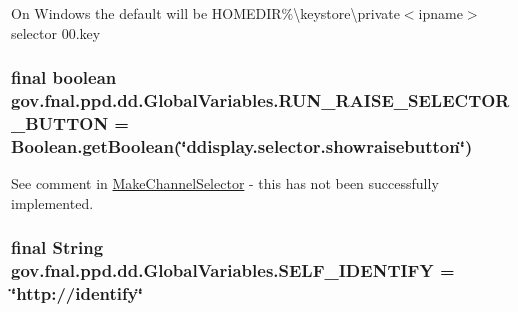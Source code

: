 On Windows the default will be H\-O\-M\-E\-D\-I\-R\%\textbackslash{}keystore\textbackslash{}private$<$ipname$>$ selector 00.\-key \hypertarget{classgov_1_1fnal_1_1ppd_1_1dd_1_1GlobalVariables_ab3d08672e81ebb3ed3cea10a5fcaf914}{
\subsubsection[{R\-U\-N\-\_\-\-R\-A\-I\-S\-E\-\_\-\-S\-E\-L\-E\-C\-T\-O\-R\-\_\-\-B\-U\-T\-T\-O\-N}]{\setlength{\rightskip}{0pt plus 5cm}final boolean gov.\-fnal.\-ppd.\-dd.\-Global\-Variables.\-R\-U\-N\-\_\-\-R\-A\-I\-S\-E\-\_\-\-S\-E\-L\-E\-C\-T\-O\-R\-\_\-\-B\-U\-T\-T\-O\-N = Boolean.\-get\-Boolean(\char`\"{}ddisplay.\-selector.\-showraisebutton\char`\"{})\hspace{0.3cm}{\ttfamily [static]}}}\label{classgov_1_1fnal_1_1ppd_1_1dd_1_1GlobalVariables_ab3d08672e81ebb3ed3cea10a5fcaf914}
See comment in \hyperlink{classgov_1_1fnal_1_1ppd_1_1dd_1_1MakeChannelSelector}{Make\-Channel\-Selector} -\/ this has not been successfully implemented. \hypertarget{classgov_1_1fnal_1_1ppd_1_1dd_1_1GlobalVariables_aaaf6fe49f89ce39ddba1fac773161acf}{
\subsubsection[{S\-E\-L\-F\-\_\-\-I\-D\-E\-N\-T\-I\-F\-Y}]{\setlength{\rightskip}{0pt plus 5cm}final String gov.\-fnal.\-ppd.\-dd.\-Global\-Variables.\-S\-E\-L\-F\-\_\-\-I\-D\-E\-N\-T\-I\-F\-Y = \char`\"{}http\-://identify\char`\"{}\hspace{0.3cm}{\ttfamily [static]}}}\label{classgov_1_1fnal_1_1ppd_1_1dd_1_1GlobalVariables_aaaf6fe49f89ce39ddba1fac773161acf}

